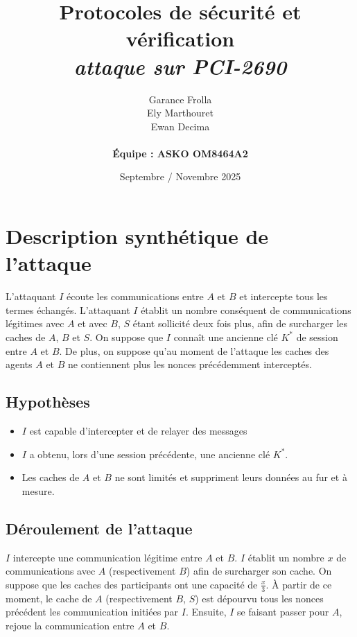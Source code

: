 \documentclass[11pt]{article}
\begin{document}
\title{\textbf{Protocoles de sécurité et vérification} \\
{\small \textit{attaque sur PCI-2690}}}

\author{Garance Frolla \\ Ely Marthouret \\ Ewan Decima \\\\ \textbf{Équipe : ASKO OM8464A2}}
\date{Septembre / Novembre 2025}

\maketitle
\tableofcontents
\newpage


\section{Description synthétique de l'attaque}

L'attaquant $I$ écoute les communications entre $A$ et $B$ et intercepte tous les termes échangés. L'attaquant $I$ établit
un nombre conséquent de communications légitimes avec $A$ et avec $B$, $S$ étant sollicité deux fois plus, afin de
surcharger les caches de $A$, $B$ et $S$. On suppose que $I$ connaît une ancienne clé $K^*$ de session entre $A$ et $B$.
De plus, on suppose qu'au moment de l'attaque les caches des agents $A$ et $B$ ne contiennent plus les nonces
précédemment interceptés.

\subsection{Hypothèses}
\begin{itemize}
    \item $I$ est capable d'intercepter et de relayer des messages 
    \item $I$ a obtenu, lors d'une session précédente, une ancienne clé $K^*$.
    \item Les caches de $A$ et $B$ ne sont limités et suppriment leurs données au fur et à mesure.

    

\end{itemize}

\subsection{Déroulement de l'attaque}

$I$ intercepte une communication légitime entre $A$ et $B$. $I$ établit un nombre $x$ de communications avec $A$
(respectivement $B$) afin de surcharger son cache. On suppose que les caches des participants ont une capacité de
$\frac{x}{3}$. À partir de ce moment, le cache de $A$ (respectivement $B$, $S$) est dépourvu tous les nonces précédent
les communication initiées par $I$. Ensuite, $I$ se faisant passer pour $A$, rejoue la communication entre $A$ et $B$.
\end{document}
